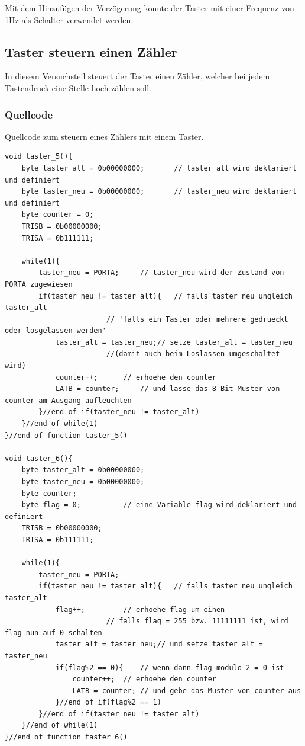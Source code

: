 \documentclass[12pt,a4paper]{article}
\begin{document}
Mit dem Hinzufügen der Verzögerung konnte der Taster mit einer Frequenz von 1Hz als Schalter verwendet werden.

\subsection{Taster steuern einen Zähler}

In diesem Versuchsteil steuert der Taster einen Zähler, welcher bei jedem Tastendruck eine Stelle hoch zählen soll.

\subsubsection*{Quellcode}

Quellcode zum steuern eines Zählers mit einem Taster.

\lstset{language=C, basicstyle=\tiny}
\begin{lstlisting}[caption = {Code zum stuern eines Zählers mit einem Schalter}, label=lst:g_9,captionpos=b]
void taster_5(){
	byte taster_alt = 0b00000000;		// taster_alt wird deklariert und definiert
	byte taster_neu = 0b00000000;		// taster_neu wird deklariert und definiert
	byte counter = 0;
	TRISB = 0b00000000;
	TRISA = 0b111111;
	
	while(1){
		taster_neu = PORTA;		// taster_neu wird der Zustand von PORTA zugewiesen
		if(taster_neu != taster_alt){	// falls taster_neu ungleich taster_alt 
						// 'falls ein Taster oder mehrere gedrueckt oder losgelassen werden'
			taster_alt = taster_neu;// setze taster_alt = taster_neu  
						//(damit auch beim Loslassen umgeschaltet wird)
			counter++;		// erhoehe den counter
			LATB = counter;		// und lasse das 8-Bit-Muster von counter am Ausgang aufleuchten
		}//end of if(taster_neu != taster_alt)
	}//end of while(1)
}//end of function taster_5()

void taster_6(){
	byte taster_alt = 0b00000000;
	byte taster_neu = 0b00000000;
	byte counter;
	byte flag = 0;			// eine Variable flag wird deklariert und definiert
	TRISB = 0b00000000;
	TRISA = 0b111111;
	
	while(1){
		taster_neu = PORTA;
		if(taster_neu != taster_alt){	// falls taster_neu ungleich taster_alt
			flag++;			// erhoehe flag um einen 
						// falls flag = 255 bzw. 11111111 ist, wird flag nun auf 0 schalten
			taster_alt = taster_neu;// und setze taster_alt = taster_neu
			if(flag%2 == 0){	// wenn dann flag modulo 2 = 0 ist
				counter++;	// erhoehe den counter
				LATB = counter;	// und gebe das Muster von counter aus
			}//end of if(flag%2 == 1)
		}//end of if(taster_neu != taster_alt)
	}//end of while(1)
}//end of function taster_6()
\end{lstlisting}
\end{document}
